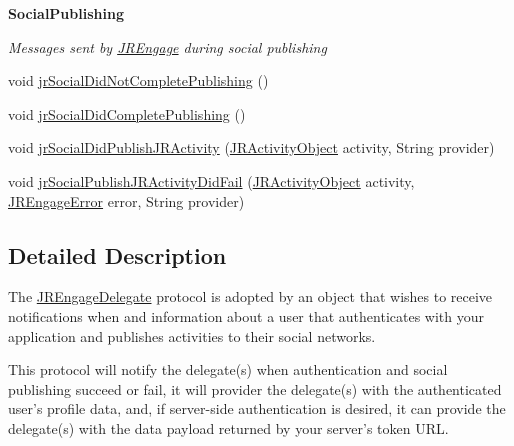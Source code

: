 \begin{Indent}{\bf SocialPublishing}\par
{\em \label{_amgrpeb046f03f7c48654b2974e7c81bd7f9b}
 Messages sent by \hyperlink{classcom_1_1janrain_1_1android_1_1engage_1_1_j_r_engage}{JREngage} during social publishing }\begin{DoxyCompactItemize}
\item 
void \hyperlink{interfacecom_1_1janrain_1_1android_1_1engage_1_1_j_r_engage_delegate_a1828e05762a1cc87d338dd51e60822be}{jrSocialDidNotCompletePublishing} ()
\item 
void \hyperlink{interfacecom_1_1janrain_1_1android_1_1engage_1_1_j_r_engage_delegate_abe261e58875824c6f9cf817a02db6614}{jrSocialDidCompletePublishing} ()
\item 
void \hyperlink{interfacecom_1_1janrain_1_1android_1_1engage_1_1_j_r_engage_delegate_a02961743a0f611a582df40310e4bd06e}{jrSocialDidPublishJRActivity} (\hyperlink{classcom_1_1janrain_1_1android_1_1engage_1_1types_1_1_j_r_activity_object}{JRActivityObject} activity, String provider)
\item 
void \hyperlink{interfacecom_1_1janrain_1_1android_1_1engage_1_1_j_r_engage_delegate_ad507d7e12581d5e779241035e07fe659}{jrSocialPublishJRActivityDidFail} (\hyperlink{classcom_1_1janrain_1_1android_1_1engage_1_1types_1_1_j_r_activity_object}{JRActivityObject} activity, \hyperlink{classcom_1_1janrain_1_1android_1_1engage_1_1_j_r_engage_error}{JREngageError} error, String provider)
\end{DoxyCompactItemize}
\end{Indent}


\subsection{Detailed Description}
The \hyperlink{interfacecom_1_1janrain_1_1android_1_1engage_1_1_j_r_engage_delegate}{JREngageDelegate} protocol is adopted by an object that wishes to receive notifications when and information about a user that authenticates with your application and publishes activities to their social networks.

This protocol will notify the delegate(s) when authentication and social publishing succeed or fail, it will provider the delegate(s) with the authenticated user's profile data, and, if server-\/side authentication is desired, it can provide the delegate(s) with the data payload returned by your server's token URL. 


